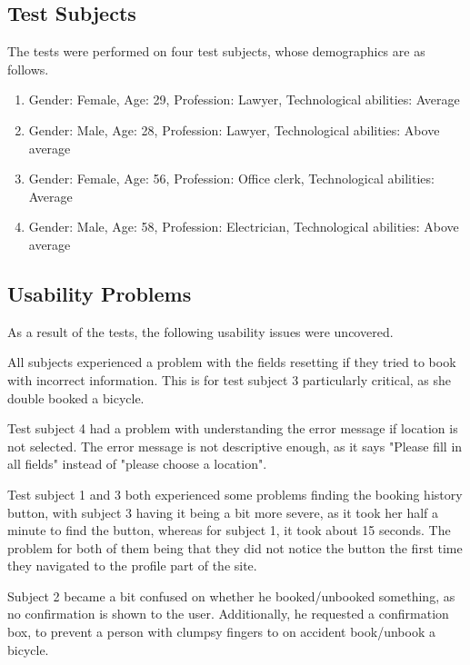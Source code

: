 \subsection{Test Subjects}
The tests were performed on four test subjects, whose demographics are as follows.
\begin{enumerate}
\item Gender: Female, Age: 29, Profession: Lawyer, Technological abilities: Average
\item Gender: Male, Age: 28, Profession: Lawyer, Technological abilities: Above average
\item Gender: Female, Age: 56, Profession: Office clerk, Technological abilities: Average
\item Gender: Male, Age: 58, Profession: Electrician, Technological abilities: Above average
\end{enumerate}

\subsection{Usability Problems}
As a result of the tests, the following usability issues were uncovered.

\begin{description}[style=nextline]
	\item[{\#}1 Fields reset]
		All subjects experienced a problem with the fields resetting if they tried to book with incorrect information.
		This is for test subject 3 particularly critical, as she double booked a bicycle.
	\item[{\#}2 Error message understandability] Test subject 4 had a problem with understanding the error message if location is not selected.
	The error message is not descriptive enough, as it says "Please fill in all fields" instead of "please choose a location".
	\item[{\#}3 Difficulty finding history] Test subject 1 and 3 both experienced some problems finding the booking history button, with subject 3 having it being a bit more severe, as it took her half a minute to find the button, whereas for subject 1, it took about 15 seconds. 
	The problem for both of them being that they did not notice the button the first time they navigated to the profile part of the site.
	\item[{\#}4 Booking/Unbooking confirmation] Subject 2 became a bit confused on whether he booked/unbooked something, as no confirmation is shown to the user.
	Additionally, he requested a confirmation box, to prevent a person with clumpsy fingers to on accident book/unbook a bicycle.
\end{description}

